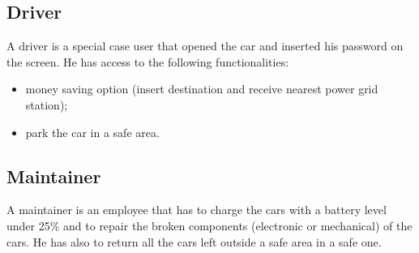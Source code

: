 \subsection{Driver}
A driver is a special case user that opened the car and inserted his password on the screen. He has access to the following functionalities:
\begin{itemize}
	\item money saving option (insert destination and receive nearest power grid station);
	\item park the car in a safe area.
\end{itemize}

\subsection{Maintainer}
A maintainer is an employee that has to charge the cars with a battery level under 25\% and to repair the broken components (electronic or mechanical) of the cars. He has also to return all the cars left outside a safe area in a safe one.